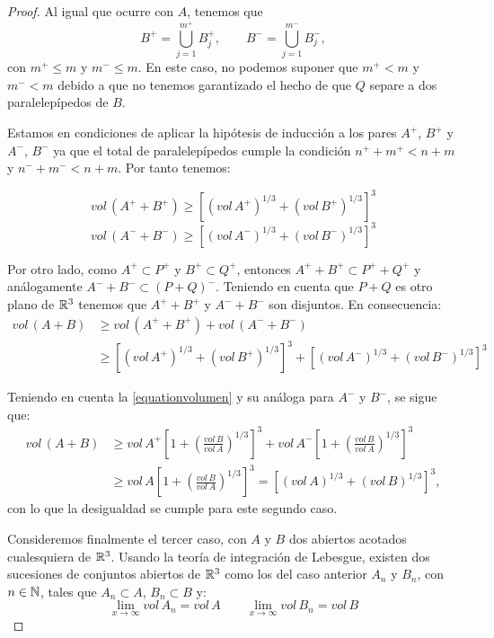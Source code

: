 \begin{proof}
Al igual que ocurre con $A$, tenemos que 
%
\begin{equation*}
    B^+ = \displaystyle\bigcup_{j=1}^{m^+} B_j^+, \qquad B^- = \displaystyle\bigcup_{j=1}^{m^-} B_j^-,
\end{equation*}
%
con $m^+ \leq m$ y $m^- \leq m$. En este caso, no podemos suponer que $m^+ < m$ y $m^- < m$ debido a que no tenemos garantizado el hecho de que $Q$ separe a dos paralelepípedos de $B$.

Estamos en condiciones de aplicar la hipótesis de inducción a los pares $A^+$, $B^+$ y $A^-$, $B^-$ ya que el total de paralelepípedos cumple la condición $n^+ + m^+ < n + m$ y $n^- + m^- < n + m$. Por tanto tenemos:

\begin{equation*}
    vol \, (A^+ + B^+) \geq \left[ (vol \, A^+)^{1/3} + (vol \, B^+)^{1/3} \right]^3
\end{equation*}
\begin{equation*}
    vol \, (A^- + B^-) \geq \left[ (vol \, A^-)^{1/3} + (vol \, B^-)^{1/3} \right]^3
\end{equation*}

Por otro lado, como $A^+ \subset P^+$ y $B^+ \subset Q^+$, entonces $A^+ + B^+ \subset P^+ + Q^+$ y análogamente $A^- + B^- \subset (P+Q)^-$. Teniendo en cuenta que $P+Q$ es otro plano de $\mathbb{R}^3$ tenemos que $A^+ + B^+$ y $A^- + B^-$ son disjuntos. En consecuencia:
%
\begin{align*}
    vol \, (A+B) &\geq vol \,(A^+ + B^+) + vol \,(A^- + B^-) \\ 
    &\geq \left[ (vol \, A^+)^{1/3} + (vol \, B^+)^{1/3} \right]^3 + \left[ (vol \, A^-)^{1/3} + (vol \, B^-)^{1/3} \right]^3
\end{align*}

Teniendo en cuenta la \autoref{equationvolumen} y su análoga para $A^-$ y $B^-$, se sigue que:
%
\begin{align*}
    vol \, (A+B) &\geq vol \, A^+ \left[ 1 + \left( \frac{vol \, B}{vol \, A} \right)^{1/3}  \right]^3 + vol \, A^- \left[ 1 + \left( \frac{vol \, B}{vol \, A} \right)^{1/3}  \right]^3 \\
    &\geq vol \, A \left[ 1 + \left( \frac{vol \, B}{vol \, A} \right)^{1/3}  \right]^3 = \left[ (vol \, A)^{1/3} + (vol \, B)^{1/3} \right]^3,
\end{align*}
%
con lo que la desigualdad se cumple para este segundo caso.

Consideremos finalmente el tercer caso, con $A$ y $B$ dos abiertos acotados cualesquiera de $\mathbb{R}^3$. Usando la teoría de integración de Lebesgue, existen dos sucesiones de conjuntos abiertos de $\mathbb{R}^3$ como los del caso anterior $A_n$ y $B_n$, con $n \in \mathbb{N}$, tales que $A_n \subset A$, $B_n \subset B$ y:
%
\begin{equation*}
    \lim_{x \to \infty} vol \, A_n = vol \, A \qquad \lim_{x \to \infty} vol \, B_n = vol \, B
\end{equation*}


\end{proof}
